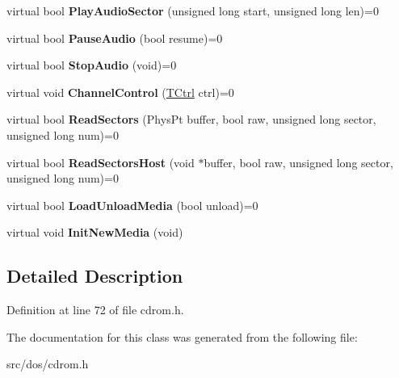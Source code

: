 \begin{DoxyCompactItemize}
\item 
\hypertarget{classCDROM__Interface_a9a90d8036bb0fccc17b147dfab6ad26f}{virtual bool {\bfseries Play\-Audio\-Sector} (unsigned long start, unsigned long len)=0}\label{classCDROM__Interface_a9a90d8036bb0fccc17b147dfab6ad26f}

\item 
\hypertarget{classCDROM__Interface_a811af8ad77b46c975473abd8aaa48f48}{virtual bool {\bfseries Pause\-Audio} (bool resume)=0}\label{classCDROM__Interface_a811af8ad77b46c975473abd8aaa48f48}

\item 
\hypertarget{classCDROM__Interface_ac16f2f2a5f081fbd1ace3ae6af34b7c3}{virtual bool {\bfseries Stop\-Audio} (void)=0}\label{classCDROM__Interface_ac16f2f2a5f081fbd1ace3ae6af34b7c3}

\item 
\hypertarget{classCDROM__Interface_a7ad6149099c04af804e543613e69d9bd}{virtual void {\bfseries Channel\-Control} (\hyperlink{structSCtrl}{T\-Ctrl} ctrl)=0}\label{classCDROM__Interface_a7ad6149099c04af804e543613e69d9bd}

\item 
\hypertarget{classCDROM__Interface_afb4989b5b1881a03123442adddcfa6d7}{virtual bool {\bfseries Read\-Sectors} (Phys\-Pt buffer, bool raw, unsigned long sector, unsigned long num)=0}\label{classCDROM__Interface_afb4989b5b1881a03123442adddcfa6d7}

\item 
\hypertarget{classCDROM__Interface_ae056d63e7b104c7a05afc7c68ee34718}{virtual bool {\bfseries Read\-Sectors\-Host} (void $\ast$buffer, bool raw, unsigned long sector, unsigned long num)=0}\label{classCDROM__Interface_ae056d63e7b104c7a05afc7c68ee34718}

\item 
\hypertarget{classCDROM__Interface_a5d52a31065d3b87924c5d059266fd20e}{virtual bool {\bfseries Load\-Unload\-Media} (bool unload)=0}\label{classCDROM__Interface_a5d52a31065d3b87924c5d059266fd20e}

\item 
\hypertarget{classCDROM__Interface_a688bdeb135e3238178883666c34aaa75}{virtual void {\bfseries Init\-New\-Media} (void)}\label{classCDROM__Interface_a688bdeb135e3238178883666c34aaa75}

\end{DoxyCompactItemize}


\subsection{Detailed Description}


Definition at line 72 of file cdrom.\-h.



The documentation for this class was generated from the following file\-:\begin{DoxyCompactItemize}
\item 
src/dos/cdrom.\-h\end{DoxyCompactItemize}
